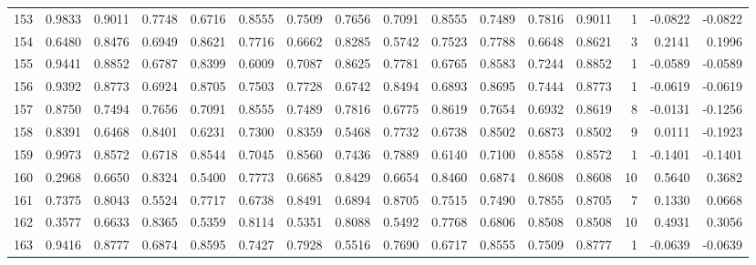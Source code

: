 \begin{tabular}{lrrrrrrrrrrrrrrr}
153 &      0.9833 &  0.9011 &  0.7748 &  0.6716 &  0.8555 &  0.7509 &  0.7656 &  0.7091 &  0.8555 &  0.7489 &   0.7816 &     0.9011 &      1 &                   -0.0822 &                    -0.0822 \\
154 &      0.6480 &  0.8476 &  0.6949 &  0.8621 &  0.7716 &  0.6662 &  0.8285 &  0.5742 &  0.7523 &  0.7788 &   0.6648 &     0.8621 &      3 &                    0.2141 &                     0.1996 \\
155 &      0.9441 &  0.8852 &  0.6787 &  0.8399 &  0.6009 &  0.7087 &  0.8625 &  0.7781 &  0.6765 &  0.8583 &   0.7244 &     0.8852 &      1 &                   -0.0589 &                    -0.0589 \\
156 &      0.9392 &  0.8773 &  0.6924 &  0.8705 &  0.7503 &  0.7728 &  0.6742 &  0.8494 &  0.6893 &  0.8695 &   0.7444 &     0.8773 &      1 &                   -0.0619 &                    -0.0619 \\
157 &      0.8750 &  0.7494 &  0.7656 &  0.7091 &  0.8555 &  0.7489 &  0.7816 &  0.6775 &  0.8619 &  0.7654 &   0.6932 &     0.8619 &      8 &                   -0.0131 &                    -0.1256 \\
158 &      0.8391 &  0.6468 &  0.8401 &  0.6231 &  0.7300 &  0.8359 &  0.5468 &  0.7732 &  0.6738 &  0.8502 &   0.6873 &     0.8502 &      9 &                    0.0111 &                    -0.1923 \\
159 &      0.9973 &  0.8572 &  0.6718 &  0.8544 &  0.7045 &  0.8560 &  0.7436 &  0.7889 &  0.6140 &  0.7100 &   0.8558 &     0.8572 &      1 &                   -0.1401 &                    -0.1401 \\
160 &      0.2968 &  0.6650 &  0.8324 &  0.5400 &  0.7773 &  0.6685 &  0.8429 &  0.6654 &  0.8460 &  0.6874 &   0.8608 &     0.8608 &     10 &                    0.5640 &                     0.3682 \\
161 &      0.7375 &  0.8043 &  0.5524 &  0.7717 &  0.6738 &  0.8491 &  0.6894 &  0.8705 &  0.7515 &  0.7490 &   0.7855 &     0.8705 &      7 &                    0.1330 &                     0.0668 \\
162 &      0.3577 &  0.6633 &  0.8365 &  0.5359 &  0.8114 &  0.5351 &  0.8088 &  0.5492 &  0.7768 &  0.6806 &   0.8508 &     0.8508 &     10 &                    0.4931 &                     0.3056 \\
163 &      0.9416 &  0.8777 &  0.6874 &  0.8595 &  0.7427 &  0.7928 &  0.5516 &  0.7690 &  0.6717 &  0.8555 &   0.7509 &     0.8777 &      1 &                   -0.0639 &                    -0.0639 \\

\end{tabular}
